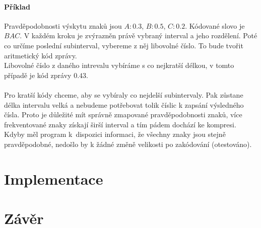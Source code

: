 \documentclass[11pt]{article}
\begin{document}
\paragraph{Příklad}
Pravděpodobnosti výskytu znaků jsou $A : 0.3$, $B : 0.5$, $C : 0.2$. Kódované
slovo je $BAC$. V každém kroku je zvýrazněn právě vybraný interval a jeho
rozdělení. Poté co určíme poslední subinterval, vybereme z něj libovolné číslo.
To bude tvořit aritmetický kód zprávy.
 \\[1cm]

Libovolné číslo z daného intrevalu vybíráme s co nejkratší délkou, v tomto případě
je kód zprávy $0.43$.

\paragraph{}
Pro kratší kódy chceme, aby se vybíraly co nejdelší subintervaly. Pak zůstane 
délka intervalu velká a nebudeme potřebovat tolik číslic k zapsání výsledného čísla.
Proto je důležité mít správně zmapované pravděpodobnosti znaků, více frekventované
znaky získají širší interval a tím pádem dochází ke kompresi. Kdyby měl program
k~dispozici informaci, že všechny znaky jsou stejně pravděpodobné, nedošlo by k žádné
změně velikosti po zakódování (otestováno).

\section{Implementace}
\section{Závěr}
\end{document}
